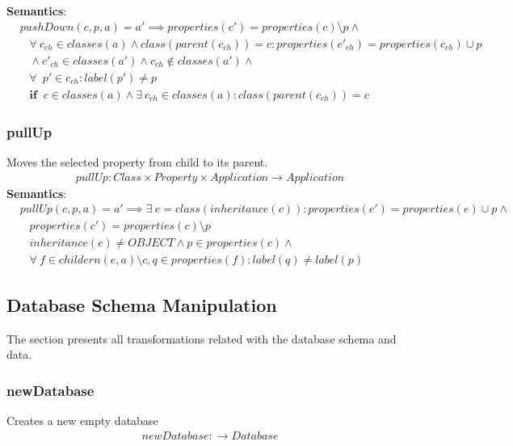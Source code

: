 \documentclass[10pt]{article}
\begin{document}
\noindent \textbf{Semantics}:
\begin{align}
& pushDown(c, p, a) = a' \implies properties(c') = properties(c) \setminus p \land \nonumber \\ 
& \;\;\; \forall \: c_{ch} \in classes(a) \land class(parent(c_{ch})) = c : properties(c'_{ch}) = properties(c_{ch}) \cup p \nonumber \\
& \;\;\;\land c'_{ch} \in classes(a') \land c_{ch} \notin classes(a') \land \nonumber \\
& \;\;\; \forall \: \; p' \in c_{ch} : label(p') \neq p \nonumber \\
& \;\;\; \mathbf{if}  \;\; c \in classes(a) \land \exists \:  c_{ch} \in classes(a) : class(parent(c_{ch})) = c
\end{align}


\subsubsection{pullUp}
Moves the selected property from child to its parent.
\begin{align}
pullUp: Class \times Property \times Application \rightarrow Application
\end{align}
\noindent \textbf{Semantics}:
\begin{align}
& pullUp(c, p, a) = a' \implies \exists \:  e = class(inheritance(c)) : properties(e') = properties(e) \cup p \land \nonumber \\
& \;\;\;  properties(c') = properties(c) \setminus p \nonumber \\
& \;\;\; inheritance(c) \neq OBJECT \land p \in properties(c) \land \nonumber \\
& \;\;\; \forall \: f \in childern(e,a) \setminus c, q \in properties(f) : label(q) \neq label(p) 
\end{align}

\subsection{Database Schema Manipulation}
The section presents all transformations related with the database schema and data.
\subsubsection{newDatabase}
Creates a new empty database
\begin{align}
newDatabase: \rightarrow Database 
\end{align}
\end{document}
